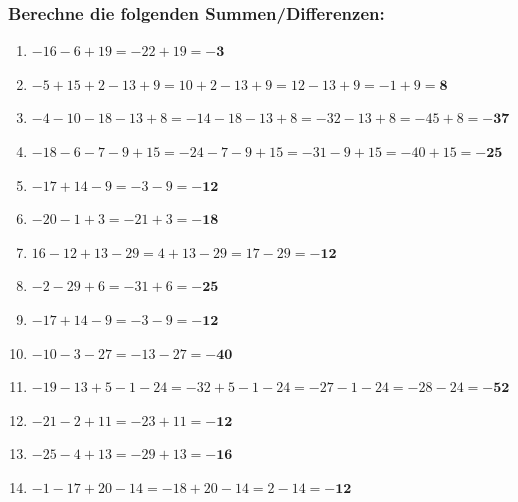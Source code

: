 \documentclass[a4paper,10pt]{article} %
\begin{document}
\subsubsection{Berechne die folgenden Summen/Differenzen:} %

\begin{enumerate}

  \item \(-16 - 6 + 19 =
    -22 + 19 =
    \mathbf{-3}\) %

  \item \(-5 + 15 + 2 - 13 + 9 =
    10 + 2 - 13 + 9 =
    12 - 13 + 9 =
    -1 + 9 =
    \mathbf{8}\) %

  \item \(-4 - 10 - 18 - 13 + 8 =
    -14 - 18 - 13 + 8 =
    -32 - 13 + 8 =
    -45 + 8 =
    \mathbf{-37}\) %

  \item \(-18 - 6 - 7 - 9 + 15 =
    -24 - 7 - 9 + 15 =
    -31 - 9 + 15 =
    -40 + 15 =
    \mathbf{-25}\) %

  \item \(-17 + 14 - 9 =
    -3 - 9 =
    \mathbf{-12}\) %

  \item \(-20 - 1 + 3 =
    -21 + 3 =
    \mathbf{-18}\) %

  \item \(16 - 12 + 13 - 29 =
    4 + 13 - 29 =
    17 - 29 =
    \mathbf{-12}\) %

  \item \(-2 - 29 + 6 =
    -31 + 6 =
    \mathbf{-25}\) %

  \item \(-17 + 14 - 9 =
    -3 - 9 =
    \mathbf{-12}\) %

  \item \(-10 - 3 - 27 =
    -13 - 27 =
    \mathbf{-40}\) %

  \item \(-19 - 13 + 5 - 1 - 24 =
    -32 + 5 - 1 - 24 =
    -27 - 1 - 24 =
    -28 - 24 =
    \mathbf{-52}\) %

  \item \(-21 - 2 + 11 =
    -23 + 11 =
    \mathbf{-12}\) %

  \item \(-25 - 4 + 13 =
    -29 + 13 =
    \mathbf{-16}\) %

  \item \(-1 - 17 + 20 - 14 =
    -18 + 20 - 14 =
    2 - 14 =
    \mathbf{-12}\) %


\end{enumerate}
\end{document}
